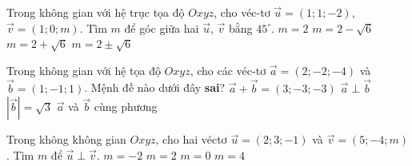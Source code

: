 \begin{ex}%
	Trong không gian với hệ trục tọa độ $Oxyz$, cho véc-tơ $\overrightarrow{u}=(1;1;-2)$, $\overrightarrow{v}=(1;0;m)$. Tìm $m$ để góc giữa hai $\overrightarrow{u}$, $\overrightarrow{v}$ bằng $45^{\circ}$.
	\choice
	{$m=2$}
	{\True $m=2-\sqrt{6}$}
	{$m=2+\sqrt{6}$}
	{$m=2 \pm \sqrt{6}$}
\end{ex}

\begin{ex}%
	Trong không gian với hệ tọa độ $Oxyz$, cho các véc-tơ $\vec{a}=\left( 2;-2;-4 \right)$ và $\vec{b}=\left( 1;-1;1 \right)$. Mệnh đề nào dưới đây \textbf{sai}?
	\choice
	{$\vec{a}+\vec{b}=\left( 3;-3;-3 \right)$}
	{$\vec{a} \perp \vec{b}$}
	{$|\vec{b}|=\sqrt{3}$}
	{\True $\vec{a}$ và $\vec{b}$ cùng phương}
\end{ex}

\begin{ex}%
	Trong không không gian $Oxyz$, cho hai véctơ $\overrightarrow{u}=(2;3 ;-1)$ và $\overrightarrow{v}=(5;-4;m)$. Tìm $m$ để $\overrightarrow{u}\perp \overrightarrow{v}$.
	\choice
	{\True $m=-2$}
	{$m=2$}
	{$m=0$}
	{$m=4$}
\end{ex}

